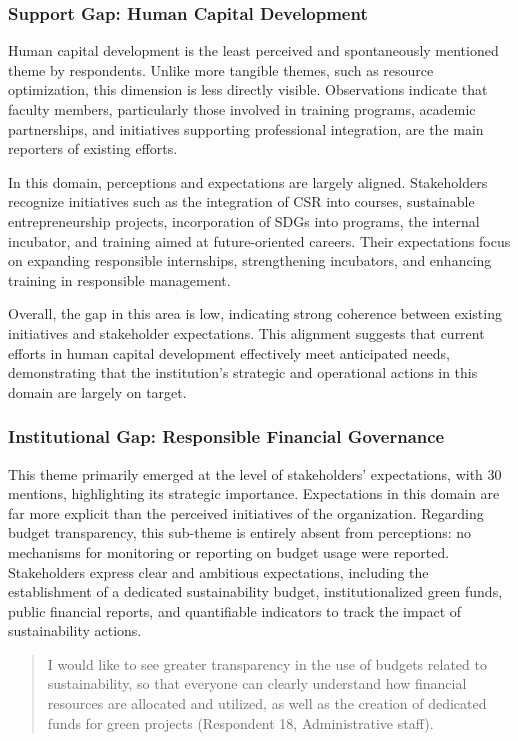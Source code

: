 \documentclass[12pt,a4paper]{article}
\begin{document}
\subsubsection{Support Gap: Human Capital Development}

Human capital development is the least perceived and spontaneously mentioned theme by respondents. Unlike more tangible themes, such as resource optimization, this dimension is less directly visible. Observations indicate that faculty members, particularly those involved in training programs, academic partnerships, and initiatives supporting professional integration, are the main reporters of existing efforts.

In this domain, perceptions and expectations are largely aligned. Stakeholders recognize initiatives such as the integration of CSR into courses, sustainable entrepreneurship projects, incorporation of SDGs into programs, the internal incubator, and training aimed at future-oriented careers. Their expectations focus on expanding responsible internships, strengthening incubators, and enhancing training in responsible management.

Overall, the gap in this area is low, indicating strong coherence between existing initiatives and stakeholder expectations. This alignment suggests that current efforts in human capital development effectively meet anticipated needs, demonstrating that the institution’s strategic and operational actions in this domain are largely on target.

\subsubsection{Institutional Gap: Responsible Financial Governance}

This theme primarily emerged at the level of stakeholders’ expectations, with 30 mentions, highlighting its strategic importance. Expectations in this domain are far more explicit than the perceived initiatives of the organization. Regarding budget transparency, this sub-theme is entirely absent from perceptions: no mechanisms for monitoring or reporting on budget usage were reported. Stakeholders express clear and ambitious expectations, including the establishment of a dedicated sustainability budget, institutionalized green funds, public financial reports, and quantifiable indicators to track the impact of sustainability actions.

\begin{quote}
I would like to see greater transparency in the use of budgets related to sustainability, so that everyone can clearly understand how financial resources are allocated and utilized, as well as the creation of dedicated funds for green projects (Respondent 18, Administrative staff).
\end{quote}
\end{document}
